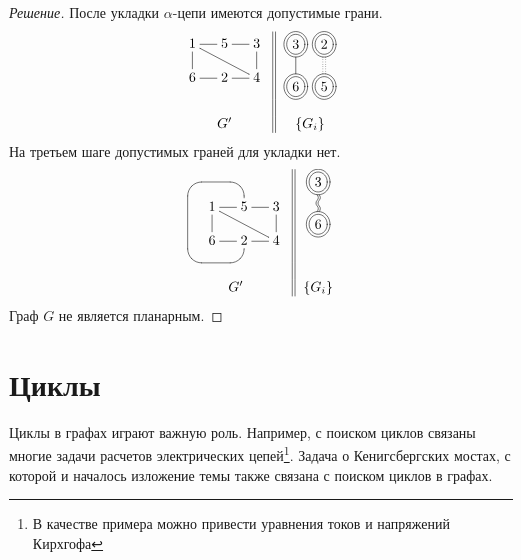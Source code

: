 \begin{proof}[Решение]
    После укладки $\alpha$-цепи имеются допустимые грани.
    \[
        \begin{tabular}{c||c}
            {\xymatrix@=12pt{
                1 \ar@{-}[d] \ar@{-}[r] \ar@{-}[drr]
                    &5 \ar@{-}[r]
                        &3 \ar@{-}[d]
                            \\
                6
                    &2 \ar@{-}[l]
                        &4 \ar@{-}[l]
            }}
            &
                {\xymatrix@=12pt{
                    *++[o][F=]{3} \ar@{-}[d]
                        \\
                    *++[o][F=]{6}
                }}
                {\xymatrix@=12pt{
                    *++[o][F=]{2}\ar@{:}[d]
                        \\
                    *++[o][F=]{5}
                }}
                    \\
            &\\
            $G'$&$\{G_i\}$
        \end{tabular}
    \]
    На третьем шаге допустимых граней для укладки нет.
    \[
        \begin{tabular}{c||c}
            {\xymatrix@=12pt{
                *{} &*{}&*{}&*{}\\
                *{}
                    &1 \ar@{-}[d] \ar@{-}[r] \ar@{-}[drr]
                        &5 \ar@{-}[r]
                            &3 \ar@{-}[d]
                                \\
                *{}
                    &6
                        &2 \ar@{-}[l] \ar@{-}`d[l]`[ll]`[lluu]`[uu][u]
                            &4 \ar@{-}[l]
            }}
            &
                {\xymatrix@=12pt{
                    *++[o][F=]{3} \ar@2{~}[d]
                        \\
                    *++[o][F=]{6}
                }}
                    \\
            &\\
            $G'$&$\{G_i\}$
        \end{tabular}
    \]
    Граф $G$ не является планарным.
\end{proof}


\section{Циклы} 
\label{sctn:graph:cycles}

Циклы в графах играют важную роль. Например, с поиском циклов связаны многие задачи расчетов электрических цепей\footnote{В качестве примера можно привести уравнения токов и напряжений Кирхгофа}. Задача о Кенигсбергских мостах, с которой и началось изложение темы также связана с поиском циклов в графах.

